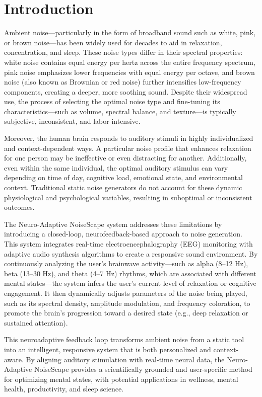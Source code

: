 \section{Introduction}
Ambient noise—particularly in the form of broadband sound such as white, pink, or brown noise—has been widely used for decades to aid in relaxation, concentration, and sleep. These noise types differ in their spectral properties: white noise contains equal energy per hertz across the entire frequency spectrum, pink noise emphasizes lower frequencies with equal energy per octave, and brown noise (also known as Brownian or red noise) further intensifies low-frequency components, creating a deeper, more soothing sound. Despite their widespread use, the process of selecting the optimal noise type and fine-tuning its characteristics—such as volume, spectral balance, and texture—is typically subjective, inconsistent, and labor-intensive.

Moreover, the human brain responds to auditory stimuli in highly individualized and context-dependent ways. A particular noise profile that enhances relaxation for one person may be ineffective or even distracting for another. Additionally, even within the same individual, the optimal auditory stimulus can vary depending on time of day, cognitive load, emotional state, and environmental context. Traditional static noise generators do not account for these dynamic physiological and psychological variables, resulting in suboptimal or inconsistent outcomes.

The Neuro-Adaptive NoiseScape system addresses these limitations by introducing a closed-loop, neurofeedback-based approach to noise generation. This system integrates real-time electroencephalography (EEG) monitoring with adaptive audio synthesis algorithms to create a responsive sound environment. By continuously analyzing the user’s brainwave activity—such as alpha (8–12 Hz), beta (13–30 Hz), and theta (4–7 Hz) rhythms, which are associated with different mental states—the system infers the user’s current level of relaxation or cognitive engagement. It then dynamically adjusts parameters of the noise being played, such as its spectral density, amplitude modulation, and frequency coloration, to promote the brain's progression toward a desired state (e.g., deep relaxation or sustained attention).

This neuroadaptive feedback loop transforms ambient noise from a static tool into an intelligent, responsive system that is both personalized and context-aware. By aligning auditory stimulation with real-time neural data, the Neuro-Adaptive NoiseScape provides a scientifically grounded and user-specific method for optimizing mental states, with potential applications in wellness, mental health, productivity, and sleep science.

